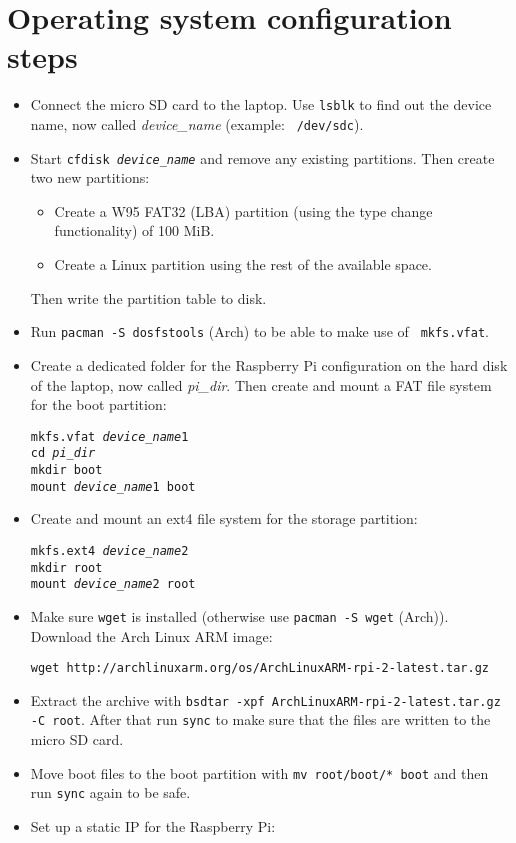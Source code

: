 \documentclass{article}
\newcommand{\arch}{{\color{red} (Arch)}}
\begin{document}
\section{Operating system configuration steps}
\begin{itemize}
    \item Connect the micro SD card to the laptop. Use {\tt lsblk} to find out 
          the device name, now called \emph{device\_name} (example: {\tt 
          /dev/sdc}).
    \item Start {\tt cfdisk \emph{device\_name}} and remove any existing 
          partitions. Then create two new partitions:
          \begin{itemize}
              \item Create a W95 FAT32 (LBA) partition (using the type change 
                    functionality) of 100 MiB.
              \item Create a Linux partition using the rest of the available 
                    space.
          \end{itemize}
          Then write the partition table to disk.
    \item Run {\tt pacman -S dosfstools} \arch{} to be able to make use of {\tt 
          mkfs.vfat}.
    \item Create a dedicated folder for the Raspberry Pi configuration on the 
          hard disk of the laptop, now called \emph{pi\_dir}.
          Then create and mount a FAT file system for the boot partition:

          {\tt mkfs.vfat \emph{device\_name}1} \\
          {\tt cd \emph{pi\_dir}} \\
          {\tt mkdir boot} \\
          {\tt mount \emph{device\_name}1 boot}
    \item Create and mount an ext4 file system for the storage partition:

          {\tt mkfs.ext4 \emph{device\_name}2} \\
          {\tt mkdir root} \\
          {\tt mount \emph{device\_name}2 root}
    \item Make sure {\tt wget} is installed (otherwise use {\tt pacman -S wget} 
          \arch{}). Download the Arch Linux ARM image:

          {\tt wget 
          http://archlinuxarm.org/os/ArchLinuxARM-rpi-2-latest.tar.gz}
    \item Extract the archive with {\tt bsdtar -xpf 
          ArchLinuxARM-rpi-2-latest.tar.gz -C root}.
          After that run {\tt sync} to make sure that the files are written to 
          the micro SD card.
    \item Move boot files to the boot partition with {\tt mv root/boot/* boot} 
          and then run {\tt sync} again to be safe.
    \item Set up a static IP for the Raspberry Pi:


\end{itemize}
\end{document}
